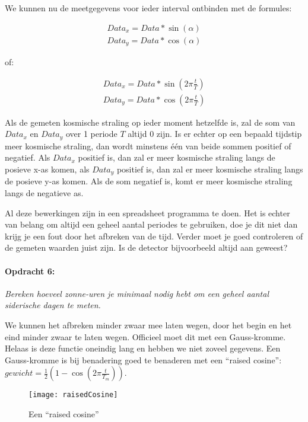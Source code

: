 We kunnen nu de meetgegevens voor ieder interval ontbinden met de
formules:

\begin{equation}
\begin{array}{c}
Data_{x}=Data*\sin(\alpha)\\
Data_{y}=Data*\cos(\alpha)
\end{array}
\end{equation}


of:

\begin{equation}
\begin{array}{c}
Data_{x}=Data*\sin(2\pi\frac{t}{T})\\
Data_{y}=Data*\cos(2\pi\frac{t}{T})
\end{array}
\end{equation}


Als de gemeten kosmische straling op ieder moment hetzelfde is, zal
de som van $Data_{x}$ en $Data_{y}$ over 1 periode $T$ altijd 0
zijn. Is er echter op een bepaald tijdstip meer kosmische straling,
dan wordt minstens één van beide sommen positief of negatief. Als
$Data_{x}$ positief is, dan zal er meer kosmische straling langs
de posieve x-as komen, als $Data_{y}$ positief is, dan zal er meer
kosmische straling langs de posieve y-as komen. Als de som negatief
is, komt er meer kosmische straling langs de negatieve as.

Al deze bewerkingen zijn in een spreadsheet programma te doen. Het
is echter van belang om altijd een geheel aantal periodes te gebruiken,
doe je dit niet dan krijg je een fout door het afbreken van de tijd.
Verder moet je goed controleren of de gemeten waarden juist zijn.
Is de detector bijvoorbeeld altijd aan geweest? 


\paragraph*{Opdracht 6:}

\emph{Bereken hoeveel zonne-uren je minimaal nodig hebt om een geheel
aantal siderische dagen te meten.}

We kunnen het afbreken minder zwaar mee laten wegen, door het begin
en het eind minder zwaar te laten wegen. Officieel moet dit met een
Gauss-kromme. Helaas is deze functie oneindig lang en hebben we niet
zoveel gegevens. Een Gauss-kromme is bij benadering goed te benaderen
met een ``raised cosine'': $gewicht=\frac{1}{2}(1-\cos(2\pi\frac{t}{T_{m}}))$.

\begin{figure}[h]
    \centering
    \texttt{[image: raisedCosine]}
    \caption{Een ``raised cosine''}
\end{figure}


